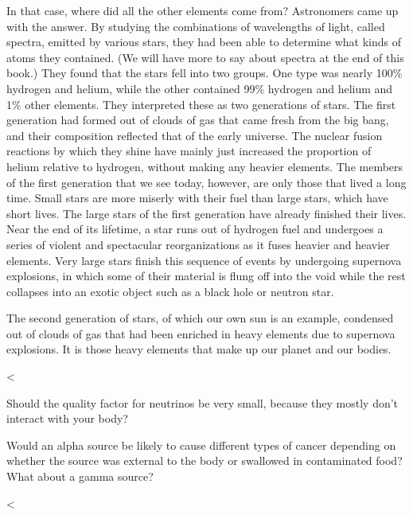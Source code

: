         In that case, where did all the other elements come from?
        Astronomers came up with the answer. By studying the
        combinations of wavelengths of light, called spectra,
        emitted by various stars, they had been able to determine
        what kinds of atoms they contained. (We will have more to
        say about spectra at the end of this book.) They found that the stars fell
        into two groups. One type was nearly 100\% hydrogen and
        helium, while the other contained 99\% hydrogen and helium
        and 1\% other elements. They interpreted these as two
        generations of stars. The first generation had formed out of
        clouds of gas that came fresh from the big bang, and their
        composition reflected that of the early universe. The
        nuclear fusion reactions by which they shine have mainly
        just increased the proportion of helium relative to
        hydrogen, without making any heavier elements.
        The members of the first generation that we see today,
        however, are only those that lived a long time. Small stars
        are more miserly with their fuel than large stars, which
        have short lives. The large stars of the first generation
        have already finished their lives. Near the end of its
        lifetime, a star runs out of hydrogen fuel and undergoes a
        series of violent and spectacular   reorganizations as it
        fuses heavier and heavier elements. Very large stars finish
        this sequence of events by undergoing supernova explosions,
        in which some of their material is flung off into the void
        while the rest collapses into an exotic object such as a
        black hole or neutron star.

        The second generation of stars, of which our own sun is an
        example, condensed out of clouds of gas that had been
        enriched in heavy elements due to supernova explosions. It
        is those heavy elements that make up our planet and our bodies.

  <%

\startdqs
        
\begin{dq}
        Should the quality factor for neutrinos be very small,  
        because they mostly don't interact with your body?
\end{dq}
\begin{dq}
        Would an alpha source be likely to cause different types
        of cancer depending on whether the source was external to
        the body or swallowed in contaminated food? What about a gamma source?
\end{dq}

<%
